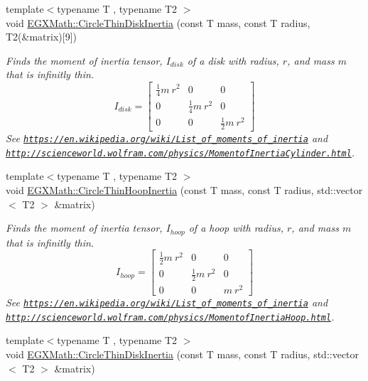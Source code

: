 \begin{DoxyCompactItemize}
{\footnotesize template$<$typename T , typename T2 $>$ }\\void \mbox{\hyperlink{group___e_g_x_math-_geometry-2_d-_circle_ga4d5e95f0986ab5e760679adeccb53181}{E\+G\+X\+Math\+::\+Circle\+Thin\+Disk\+Inertia}} (const T mass, const T radius, T2(\&matrix)\mbox{[}9\mbox{]})
\begin{DoxyCompactList}\small\item\em Finds the moment of inertia tensor, $I_{disk}$ of a disk with radius, $r$, and mass $m$ that is infinitly thin. \[ I_{disk}=\begin{bmatrix} \frac{1}{4}m\ r^2 & 0 & 0\\ 0 & \frac{1}{4}m\ r^2 & 0\\ 0 & 0 & \frac{1}{2}m\ r^2 \end{bmatrix} \] See \href{https://en.wikipedia.org/wiki/List_of_moments_of_inertia}{\tt https\+://en.\+wikipedia.\+org/wiki/\+List\+\_\+of\+\_\+moments\+\_\+of\+\_\+inertia} and \href{http://scienceworld.wolfram.com/physics/MomentofInertiaCylinder.html}{\tt http\+://scienceworld.\+wolfram.\+com/physics/\+Momentof\+Inertia\+Cylinder.\+html}. \end{DoxyCompactList}\item 
{\footnotesize template$<$typename T , typename T2 $>$ }\\void \mbox{\hyperlink{group___e_g_x_math-_geometry-2_d-_circle_ga902bfe249e733c8d2917600cc4a3392b}{E\+G\+X\+Math\+::\+Circle\+Thin\+Hoop\+Inertia}} (const T mass, const T radius, std\+::vector$<$ T2 $>$ \&matrix)
\begin{DoxyCompactList}\small\item\em Finds the moment of inertia tensor, $I_{hoop}$ of a hoop with radius, $r$, and mass $m$ that is infinitly thin. \[ I_{hoop}=\begin{bmatrix} \frac{1}{2}m\ r^2 & 0 & 0\\ 0 & \frac{1}{2}m\ r^2 & 0\\ 0 & 0 & m\ r^2 \end{bmatrix} \] See \href{https://en.wikipedia.org/wiki/List_of_moments_of_inertia}{\tt https\+://en.\+wikipedia.\+org/wiki/\+List\+\_\+of\+\_\+moments\+\_\+of\+\_\+inertia} and \href{http://scienceworld.wolfram.com/physics/MomentofInertiaHoop.html}{\tt http\+://scienceworld.\+wolfram.\+com/physics/\+Momentof\+Inertia\+Hoop.\+html}. \end{DoxyCompactList}\item 
{\footnotesize template$<$typename T , typename T2 $>$ }\\void \mbox{\hyperlink{group___e_g_x_math-_geometry-2_d-_circle_ga2f2dedb5c96a67a98d3434ef3dc81b1d}{E\+G\+X\+Math\+::\+Circle\+Thin\+Disk\+Inertia}} (const T mass, const T radius, std\+::vector$<$ T2 $>$ \&matrix)

\end{DoxyCompactItemize}
